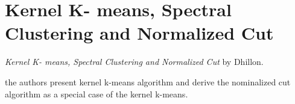 \section{Kernel K- means, Spectral Clustering and Normalized Cut}
\label{ch:dhillon04}

\textit{Kernel K- means, Spectral Clustering and Normalized Cut} by Dhillon.
\newline

the authors present kernel k-means algorithm and derive the nominalized cut algorithm as a special case of the kernel k-means.


